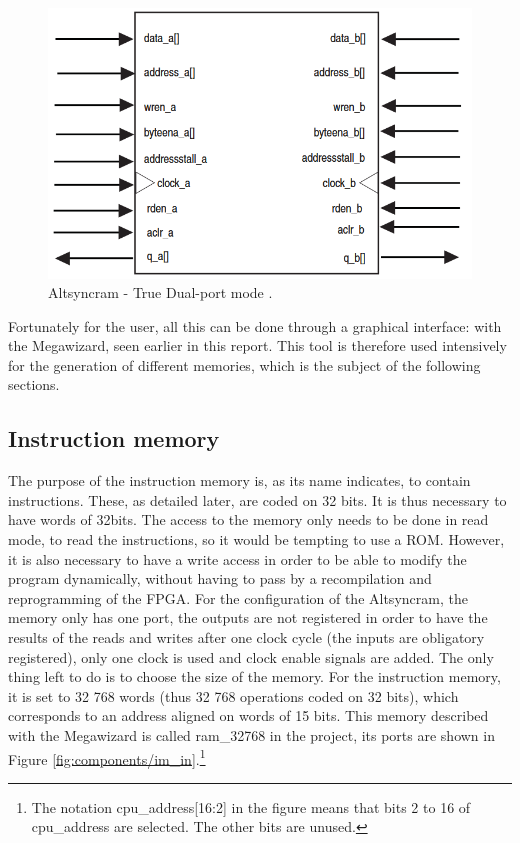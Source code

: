 \begin{figure}[H]
    \centering
    \includegraphics[scale=0.6]{Chapter3-CPU/res/altsyncram.PNG}
    \caption{Altsyncram - True Dual-port mode \cite{ram}.}
    \label{fig:memories/altsyncram}
\end{figure}

Fortunately for the user, all this can be done through a graphical interface: with the Megawizard, 
seen earlier in this report. This tool is therefore used intensively for the generation of 
different memories, which is the subject of the following sections.

\subsection{Instruction memory}

The purpose of the instruction memory is, as its name indicates, to contain instructions. These, as 
detailed later, are coded on 32 bits. It is thus necessary to have words of 32bits. The 
access to the memory only needs to be done in read mode, to read the instructions, so it would be tempting 
to use a ROM. However, it is also necessary to have a write access in order to be able to modify the 
program dynamically, without having to pass by a recompilation and reprogramming of the FPGA. 
For the configuration of the Altsyncram, the 
memory only has one port, the outputs are not registered in order to have the results of the reads 
and writes after one clock cycle (the inputs are obligatory registered), only one clock is used and 
clock enable signals are added. The only thing left to do is to choose the size of the memory. For 
the instruction memory, it is set to 32 768 words (thus 32 768 operations coded on 32 bits), which 
corresponds to an address aligned on words of 15 bits. This memory described with the Megawizard 
is called ram\_32768 in the project, its ports are shown in Figure \ref{fig:components/im_in}.\footnote{
The notation cpu\_address[16:2] in the figure means that bits 2 to 16 of cpu\_address are selected. 
The other bits are unused.}

